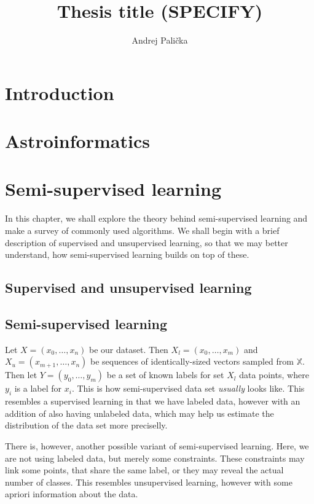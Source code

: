 \documentclass[thesis=M,english]{FITthesis}[2012/10/20]
\title{Thesis title (SPECIFY)}
\author{Andrej Pali{\v c}ka} %
\begin{document}

\chapter{Introduction}



\chapter{Astroinformatics}

\chapter{Semi-supervised learning}
In this chapter, we shall explore the theory behind semi-supervised learning and make a survey of commonly used algorithms. We shall begin with a brief description of supervised and unsupervised learning,
so that we may better understand, how semi-supervised learning builds on top of these.
\section{Supervised and unsupervised learning}
\section{Semi-supervised learning}
Let \(X=(x_0, \dots, x_n)\) be our dataset. Then \(X_l=\left(x_0,\dots,x_m\right)\) and \(X_u=\left(x_{m+1},\dots,x_n\right)\) be sequences of identically-sized vectors sampled from \(\mathbb{X}\). Then let \(Y=\left(y_0, \dots, y_m\right)\) be a set of known labels for set \(X_l\) data points, where \(y_i\) is a label for \(x_i\). This is how semi-supervised data set \emph{usually} looks like. This resembles a supervised learning in that we have labeled data, however with an addition of also having unlabeled data, which may help us estimate the distribution of the data set more preciselly.

There is, however, another possible variant of semi-supervised learning. Here, we are not using labeled data, but merely some constraints. These constraints may link some points, that share the same label, or they may reveal the actual number of classes. This resembles unsupervised learning, however with some apriori information about the data.
\end{document}
